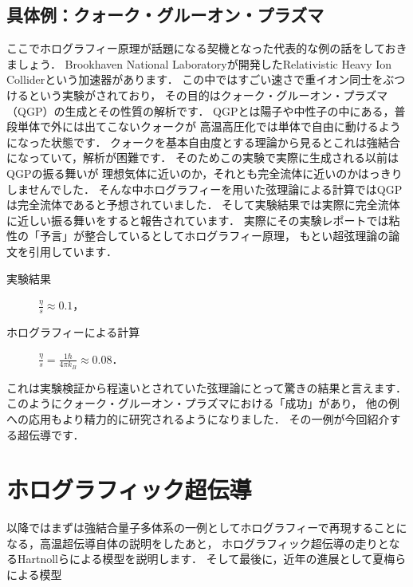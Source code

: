 \documentclass[b5paper,11pt,dvipdfmx]{jsarticle}
\numberwithin{equation}{section}
\theoremstyle{definition}
\begin{document}
\subsection{具体例：クォーク・グルーオン・プラズマ}
ここでホログラフィー原理が話題になる契機となった代表的な例の話をしておきましょう．
Brookhaven National Laboratoryが開発したRelativistic Heavy Ion Colliderという加速器があります．
この中ではすごい速さで重イオン同士をぶつけるという実験がされており，
その目的はクォーク・グルーオン・プラズマ（QGP）の生成とその性質の解析です．
QGPとは陽子や中性子の中にある，普段単体で外には出てこないクォークが
高温高圧化では単体で自由に動けるようになった状態です．
クォークを基本自由度とする理論から見るとこれは強結合になっていて，解析が困難です．
そのためこの実験で実際に生成される以前はQGPの振る舞いが
理想気体に近いのか，それとも完全流体に近いのかはっきりしませんでした．
そんな中ホログラフィーを用いた弦理論による計算ではQGPは完全流体であると予想されていました\cite{Policastro01,Kovtun04}．
そして実験結果では実際に完全流体に近しい振る舞いをすると報告されています\cite{PHENIX06}．
実際にその実験レポートでは粘性の「予言」が整合しているとしてホログラフィー原理，
もとい超弦理論の論文\cite{Kovtun04}を引用しています．
\begin{description}
    \item[実験結果] $\frac{\eta}{s} \approx 0.1$，
    \item[ホログラフィーによる計算] $\frac{\eta}{s} = \frac{1 \hbar}{4 \pi k_B} \approx 0.08$．
\end{description}
これは実験検証から程遠いとされていた弦理論にとって驚きの結果と言えます．
このようにクォーク・グルーオン・プラズマにおける「成功」があり，
他の例への応用もより精力的に研究されるようになりました．
その一例が今回紹介する超伝導です．


\section{ホログラフィック超伝導}
以降ではまずは強結合量子多体系の一例としてホログラフィーで再現することになる，高温超伝導自体の説明をしたあと，
ホログラフィック超伝導の走りとなるHartnollらによる模型\cite{Hartnoll08a,Hartnoll08b}を説明します．
そして最後に，近年の進展として夏梅らによる模型\cite{Natsuume22}
\end{document}
